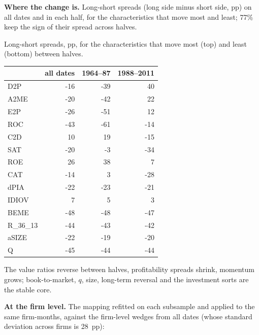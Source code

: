 \documentclass[11pt]{article}
\begin{document}
\textbf{Where the change is.} Long-short spreads (long side minus short
side, pp) on all dates and in each half, for the characteristics that move
most and least; 77\% keep the sign of their spread across halves.

\begin{tbl}{Long-short spreads, pp, for the characteristics that move most (top) and least (bottom) between halves.}
\begin{tabular}{lrrr}\toprule
 & all dates & 1964--87 & 1988--2011\\\midrule
D2P & -16 & -39 & 40\\
A2ME & -20 & -42 & 22\\
E2P & -26 & -51 & 12\\
ROC & -43 & -61 & -14\\
C2D & 10 & 19 & -15\\
SAT & -20 & -3 & -34\\
ROE & 26 & 38 & 7\\
CAT & -14 & 3 & -28\\
\midrule
dPIA & -22 & -23 & -21\\
IDIOV & 7 & 5 & 3\\
BEME & -48 & -48 & -47\\
R\_36\_13 & -44 & -43 & -42\\
aSIZE & -22 & -19 & -20\\
Q & -45 & -44 & -44\\
\bottomrule
\end{tabular}
\end{tbl}

The value ratios reverse between halves, profitability spreads shrink,
momentum grows; book-to-market, $q$, size, long-term reversal and the
investment sorts are the stable core.

\textbf{At the firm level.} The mapping refitted on each subsample and
applied to the same firm-months, against the firm-level wedges from all
dates (whose standard deviation across firms is 28~pp):
\end{document}

